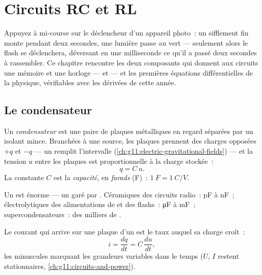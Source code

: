 \chapter{Circuits RC et RL}\label{ch:g12:rc-rl-circuits}

Appuyez à mi-course sur le déclencheur d'un appareil photo~: un
sifflement fin monte pendant deux secondes, une lumière passe au
vert --- seulement alors le flash se déclenchera, déversant en une
milliseconde ce qu'il a passé deux secondes à rassembler. Ce chapitre
rencontre les deux composants qui donnent aux circuits une mémoire et
une horloge ---  et  --- et les
premières équations différentielles de la physique, vérifiables avec
les dérivées de cette année.

\section{Le condensateur}

\begin{definition}\label{def:g12:rc-rl-circuits:capacitor}
Un \emph{condensateur} est une paire de plaques
métalliques en regard séparées par un isolant mince. Branchées
à une source, les plaques prennent des charges opposées $+q$ et $-q$
--- un  remplit l'intervalle
(\cref{ch:g11:electric-gravitational-fields}) --- et la
tension $u$ entre les plaques est proportionnelle à
la charge stockée~:
\[ q = C\,u . \]
La constante $C$ est la \emph{capacité}, en
\emph{farads} (\unit{F})~: $\qty{1}{F} = \qty{1}{C/V}$.
\end{definition}

\begin{example}\label{ex:g12:rc-rl-circuits:orders}
Un  est énorme --- un
 garé par . Céramiques des
circuits radio~: \unit{pF} à \unit{nF}~; électrolytiques des
alimentations de  et des flashs~:
\unit{\micro F} à \unit{mF}~; supercondensateurs~: des milliers de
.
\end{example}

\begin{proposition}\label{prop:g12:rc-rl-circuits:cdudt}
Le courant qui arrive sur une plaque d'un
 est le taux auquel sa charge croît~:
\[
i = \frac{dq}{dt} = C\,\frac{du}{dt} ,
\]
les minuscules marquant les grandeurs variables dans le temps
($U$, $I$ restent stationnaires, \cref{ch:g11:circuits-and-power}).
\end{proposition}

